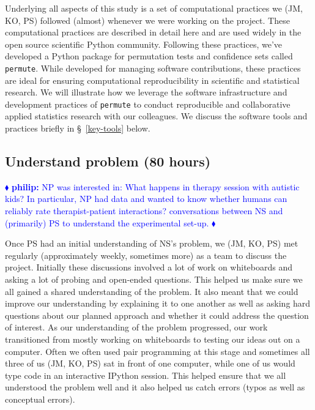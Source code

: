 \documentclass[]{article}
\newcommand{\philip}[1] { \textcolor{blue} {
\ensuremath{\blacklozenge} {\bf philip:}  {#1}
\ensuremath{\blacklozenge} } }
\begin{document}
Underlying all aspects of this study is a set of computational practices we
(JM, KO, PS) followed (almost) whenever we were working on the project.
These computational practices are described in detail here
\cite{millman2014developing} and are used widely in the open source scientific
Python community.
Following these practices, we've developed a Python package for permutation
tests and confidence sets called \texttt{permute}.
While developed for managing software contributions, these practices are ideal
for ensuring computational reproducibility in scientific and statistical
research.
We will illustrate how we leverage the software infrastructure and development
practices of \texttt{permute} to conduct reproducible and collaborative applied
statistics research with our colleagues.
We discuss the software tools and practices briefly in \S~\ref{key-tools} below.

\subsection{Understand problem (80 hours)}

\philip{
NP was interested in:  What happens in therapy session with autistic kids?
In particular, NP had data and wanted to know whether humans can reliably rate
therapist-patient interactions?
conversations between NS and (primarily) PS to understand the experimental
set-up.
}

Once PS had an initial understanding of NS's problem, we (JM, KO, PS)
met regularly (approximately weekly, sometimes more) as a team to discuss the
project.  Initially these discussions involved a lot of work on whiteboards
and asking a lot of probing and open-ended questions.  This helped us
make sure we all gained a shared understanding of the problem.  It also
meant that we could improve our understanding by explaining it to one
another as well as asking hard questions about our planned approach
and whether it could address the question of interest.
As our understanding of the problem progressed, our work transitioned
from mostly working on whiteboards to testing our ideas out on a
computer.  Often we often used pair programming at this stage and sometimes
all three of us (JM, KO, PS) sat in front of one computer, while one of us
would type code in an interactive IPython session.
This helped ensure that we all understood the problem well and it also
helped us catch errors (typos as well as conceptual errors).
\end{document}
